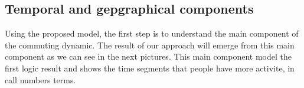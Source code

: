 \newpage
\subsection{Temporal and gepgraphical components}

Using the proposed model, the first step is to understand the main component of the commuting dynamic. The result of our approach will emerge from this main component as we can see in the next pictures. This main component model the first logic result and shows the time segments that people have more activite, in call numbers terms.

\begin{figure}[ht]
\centering
{}
\label{fig:fig1}
\end{figure}


